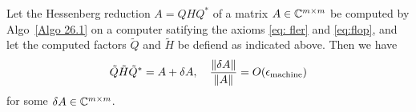 \begin{theorem}
\label{thm: Backstab of Hessenberg reduction}
Let the Hessenberg reduction $A = QHQ^* $ of a matrix $A\in \mathbb{C}^{m\times m}$ be computed by Algo~\ref{Algo 26.1} on a computer satifying the axioms \eqref{eq: fler} and \eqref{eq:flop}, and let the computed factors $\tilde Q$ and $ \tilde H $ be defiend as indicated above. Then we have 
\begin{equation}
\label{eq: backstab of Hessenberg}
    \tilde Q \tilde H \tilde Q ^*  = A + \delta A, \quad \frac{\|\delta A\|}{\|A\|} = O(\epsilon_{\text{machine}})
\end{equation}
for some $ \delta A \in \mathbb{C}^{m\times m} $. 

\end{theorem}
